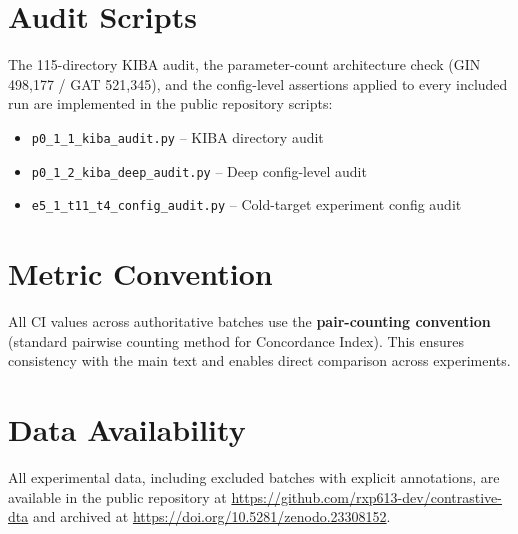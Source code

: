 \documentclass[10pt,a4paper]{article}
\begin{document}
\section{Audit Scripts}

The 115-directory KIBA audit, the parameter-count architecture check (GIN 498,177 / GAT 521,345), and the config-level assertions applied to every included run are implemented in the public repository scripts:
\begin{itemize}
\item \texttt{p0\_1\_1\_kiba\_audit.py} -- KIBA directory audit
\item \texttt{p0\_1\_2\_kiba\_deep\_audit.py} -- Deep config-level audit
\item \texttt{e5\_1\_t11\_t4\_config\_audit.py} -- Cold-target experiment config audit
\end{itemize}

\section{Metric Convention}

All CI values across authoritative batches use the \textbf{pair-counting convention} (standard pairwise counting method for Concordance Index). This ensures consistency with the main text and enables direct comparison across experiments.

\section{Data Availability}

All experimental data, including excluded batches with explicit annotations, are available in the public repository at \url{https://github.com/rxp613-dev/contrastive-dta} and archived at \url{https://doi.org/10.5281/zenodo.23308152}.


\end{document}
